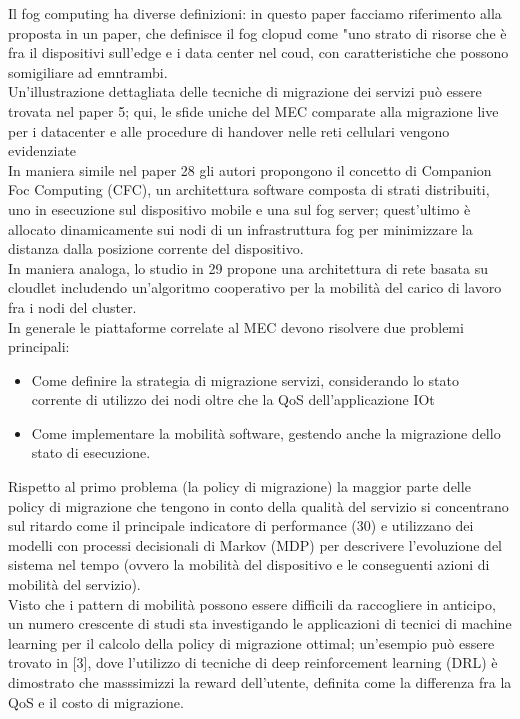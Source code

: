 \documentclass[11pt]{article}
\begin{document}
	Il fog computing ha diverse definizioni: in questo paper facciamo riferimento alla proposta in un paper, che definisce il fog clopud come "uno strato di risorse che è fra il dispositivi sull'edge e i data center nel coud, con caratteristiche che possono somigiliare ad emntrambi. \\
	Un'illustrazione dettagliata delle tecniche di migrazione dei servizi può essere trovata nel paper 5; qui, le sfide uniche del MEC comparate alla migrazione live per i datacenter e alle procedure di handover nelle reti cellulari vengono evidenziate \\
	In maniera simile nel paper 28 gli autori propongono il concetto di Companion Foc Computing (CFC), un architettura software composta di strati distribuiti, uno in esecuzione sul dispositivo mobile e una sul fog server; quest'ultimo è allocato dinamicamente sui nodi di un infrastruttura fog per minimizzare la distanza dalla posizione corrente del dispositivo. \\
	In maniera analoga, lo studio in 29 propone una architettura di rete basata su cloudlet includendo un'algoritmo cooperativo per la mobilità del carico di lavoro fra i nodi del cluster. \\
	In generale le piattaforme correlate al MEC devono risolvere due problemi principali:
	\begin{itemize}
		\item Come definire la strategia di migrazione servizi, considerando lo stato corrente di utilizzo dei nodi oltre che la QoS dell'applicazione IOt
		\item Come implementare la mobilità software, gestendo anche la migrazione dello stato di esecuzione.
	\end{itemize}
	Rispetto al primo problema (la policy di migrazione) la maggior parte delle policy di migrazione che tengono in conto della qualità del servizio si concentrano sul ritardo come il principale indicatore di performance (30) e utilizzano dei modelli con processi decisionali di Markov (MDP) per descrivere l'evoluzione del sistema nel tempo (ovvero la mobilità del dispositivo e le conseguenti azioni di mobilità del servizio). \\
	Visto che i pattern di mobilità possono essere difficili da raccogliere in anticipo, un numero crescente di studi sta investigando le applicazioni di tecnici di machine learning per il calcolo della policy di migrazione ottimal; un'esempio può essere trovato in [3], dove l'utilizzo di tecniche di deep reinforcement learning (DRL) è dimostrato che masssimizzi la reward dell'utente, definita come la differenza fra la QoS e il costo di migrazione. \\
\end{document}
